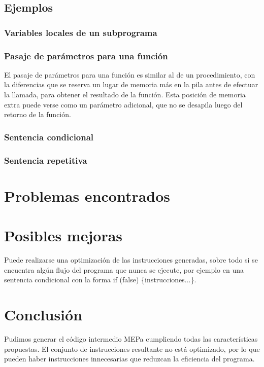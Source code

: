 \subsection{Ejemplos}

\subsubsection{Variables locales de un subprograma}

\subsubsection{Pasaje de parámetros para una función}
El pasaje de parámetros para una función es similar al de un procedimiento, con la diferencias que se reserva un lugar de memoria más en la pila antes de efectuar la llamada, para obtener el resultado de la función. Esta posición de memoria extra puede verse como un parámetro adicional, que no se desapila luego del retorno de la función.

\subsubsection{Sentencia condicional}

\subsubsection{Sentencia repetitiva}

\section{Problemas encontrados}

\section{Posibles mejoras}
Puede realizarse una optimización de las instrucciones generadas, sobre todo si se encuentra algún flujo del programa que nunca se ejecute, por ejemplo en una sentencia condicional con la forma if (false) \{instrucciones...\}.

\section{Conclusión}
Pudimos generar el código intermedio MEPa cumpliendo todas las características propuestas. El conjunto de instrucciones resultante no está optimizado, por lo que pueden haber instrucciones innecesarias que reduzcan la eficiencia del programa.